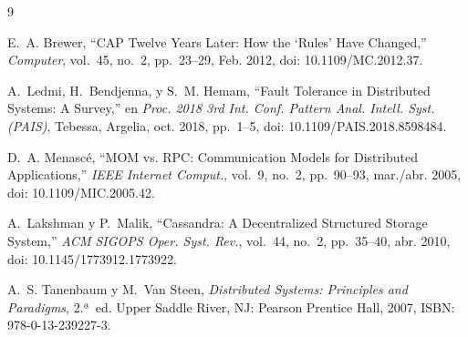 \documentclass[12pt, a4paper]{article}
\begin{document}
\newpage
\begin{thebibliography}{9}

E.~A. Brewer,
``CAP Twelve Years Later: How the `Rules' Have Changed,''
\textit{Computer}, vol.~45, no.~2, pp.~23--29, Feb. 2012,
doi: 10.1109/MC.2012.37.

A.~Ledmi, H.~Bendjenna, y S.~M. Hemam,
``Fault Tolerance in Distributed Systems: A Survey,''
en \textit{Proc. 2018 3rd Int. Conf. Pattern Anal. Intell. Syst.
(PAIS)}, Tebessa, Argelia, oct. 2018, pp.~1--5,
doi: 10.1109/PAIS.2018.8598484.

D.~A. Menasc\'{e},
``MOM vs. RPC: Communication Models for Distributed Applications,''
\textit{IEEE Internet Comput.}, vol.~9, no.~2, pp.~90--93,
mar./abr. 2005,
doi: 10.1109/MIC.2005.42.

A.~Lakshman y P.~Malik,
``Cassandra: A Decentralized Structured Storage System,''
\textit{ACM SIGOPS Oper. Syst. Rev.}, vol.~44, no.~2, pp.~35--40,
abr. 2010,
doi: 10.1145/1773912.1773922.

A.~S. Tanenbaum y M.~Van Steen,
\textit{Distributed Systems: Principles and Paradigms}, 2.ª~ed.
Upper Saddle River, NJ: Pearson Prentice Hall, 2007,
ISBN: 978-0-13-239227-3.

\end{thebibliography}
\end{document}
